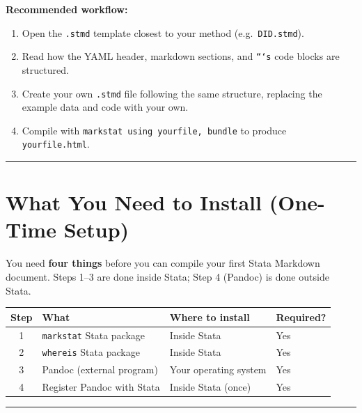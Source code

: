 \documentclass[paper=a4, fontsize=11pt]{scrartcl}
\newcommand{\horrule}[1]{\rule{\linewidth}{#1}}
\begin{document}
\medskip
\begin{tipbox}
\textbf{Recommended workflow:}
\begin{enumerate}
  \item Open the \texttt{.stmd} template closest to your method (e.g.\ \texttt{DID.stmd}).
  \item Read how the YAML header, markdown sections, and \texttt{```s} code blocks are
        structured.
  \item Create your own \texttt{.stmd} file following the same structure, replacing the
        example data and code with your own.
  \item Compile with \texttt{markstat using yourfile, bundle} to produce
        \texttt{yourfile.html}.
\end{enumerate}
\end{tipbox}

\bigskip\horrule{0.4pt}\bigskip

\section{What You Need to Install (One-Time Setup)}

You need \textbf{four things} before you can compile your first Stata Markdown document.
Steps 1--3 are done inside Stata; Step 4 (Pandoc) is done outside Stata.

\medskip
\begin{center}
\begin{tabular}{clll}
\toprule
\textbf{Step} & \textbf{What} & \textbf{Where to install} & \textbf{Required?} \\
\midrule
1 & \texttt{markstat} Stata package & Inside Stata & Yes \\
2 & \texttt{whereis} Stata package  & Inside Stata & Yes \\
3 & Pandoc (external program)       & Your operating system & Yes \\
4 & Register Pandoc with Stata      & Inside Stata (once) & Yes \\
\bottomrule
\end{tabular}
\end{center}

\bigskip\horrule{0.4pt}\bigskip

\end{document}
